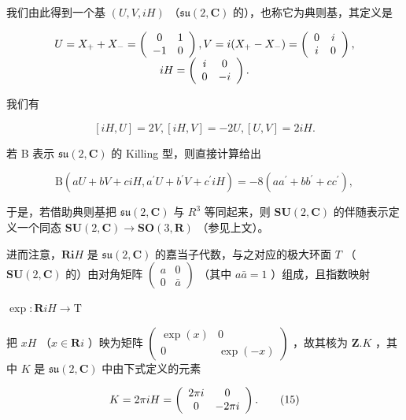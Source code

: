 我们由此得到一个基 \((U, V, iH)\) （\(\mathfrak{su}(2, \mathbf{C})\) 的），也称它为典则基，其定义是

\[
\begin{array}{c} U = X _ {+} + X _ {-} = \left( \begin{array}{c c} 0 & 1 \\ - 1 & 0 \end{array} \right), V = i (X _ {+} - X _ {-}) = \left( \begin{array}{c c} 0 & i \\ i & 0 \end{array} \right), \\ i H = \left( \begin{array}{c c} i & 0 \\ 0 & - i \end{array} \right). \end{array}
\]

我们有

\[
[ i H, U ] = 2 V, [ i H, V ] = - 2 U, [ U, V ] = 2 i H.\tag{13}
\]

若 B 表示 \(\mathfrak{su}(2,\mathbf{C})\) 的 Killing 型，则直接计算给出

\[
\mathrm{B} (a U + b V + c i H, a ^ {\prime} U + b ^ {\prime} V + c ^ {\prime} i H) = - 8 (a a ^ {\prime} + b b ^ {\prime} + c c ^ {\prime}),\tag{14}
\]

于是，若借助典则基把 \(\mathfrak{su}(2,\mathbf{C})\) 与 \(R^{3}\) 等同起来，则 \(\mathbf{SU}(2,\mathbf{C})\) 的伴随表示定义一个同态 \(\mathbf{SU}(2,\mathbf{C})\to\mathbf{SO}(3,\mathbf{R})\) （参见上文）。

进而注意，\(\mathbf{Ri}H\) 是 \(\mathfrak{su}(2,\mathbf{C})\) 的嘉当子代数，与之对应的极大环面 \(T\) （\(\mathbf{SU}(2,\mathbf{C})\) 的）由对角矩阵 \(\left( \begin{array}{cc}a & 0\\ 0 & \bar{a} \end{array} \right)\) （其中 \(a\bar{a} = 1\) ）组成，且指数映射

\(\exp : \mathbf{R}iH \to \mathrm{T}\)

把 \(xH\) （\(x \in \mathbf{R}i\) ）映为矩阵 \(\left( \begin{array}{cc}\exp (x) & 0\\ 0 & \exp (-x) \end{array} \right)\) ，故其核为 \(\mathbf{Z}.K\) ，其中 \(K\) 是 \(\mathfrak{su}(2,\mathbf{C})\) 中由下式定义的元素

\[
K = 2 \pi i H = \left( \begin{array}{c c} 2 \pi i & 0 \\ 0 & - 2 \pi i \end{array} \right).\tag{15}
\]

